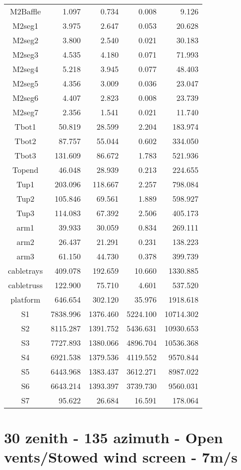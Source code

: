 \begin{longtable}{crrrr}
 M2Baffle & 1.097 & 0.734 & 0.008 & 9.126 \\
 M2seg1 & 3.975 & 2.647 & 0.053 & 20.628 \\
 M2seg2 & 3.800 & 2.540 & 0.021 & 30.183 \\
 M2seg3 & 4.535 & 4.180 & 0.071 & 71.993 \\
 M2seg4 & 5.218 & 3.945 & 0.077 & 48.403 \\
 M2seg5 & 4.356 & 3.009 & 0.036 & 23.047 \\
 M2seg6 & 4.407 & 2.823 & 0.008 & 23.739 \\
 M2seg7 & 2.356 & 1.541 & 0.021 & 11.740 \\
 Tbot1 & 50.819 & 28.599 & 2.204 & 183.974 \\
 Tbot2 & 87.757 & 55.044 & 0.602 & 334.050 \\
 Tbot3 & 131.609 & 86.672 & 1.783 & 521.936 \\
 Topend & 46.048 & 28.939 & 0.213 & 224.655 \\
 Tup1 & 203.096 & 118.667 & 2.257 & 798.084 \\
 Tup2 & 105.846 & 69.561 & 1.889 & 598.927 \\
 Tup3 & 114.083 & 67.392 & 2.506 & 405.173 \\
 arm1 & 39.933 & 30.059 & 0.834 & 269.111 \\
 arm2 & 26.437 & 21.291 & 0.231 & 138.223 \\
 arm3 & 61.150 & 44.730 & 0.378 & 399.739 \\
 cabletrays & 409.078 & 192.659 & 10.660 & 1330.885 \\
 cabletruss & 122.900 & 75.710 & 4.601 & 537.520 \\
 platform & 646.654 & 302.120 & 35.976 & 1918.618 \\
 S1 & 7838.996 & 1376.460 & 5224.100 & 10714.302 \\
 S2 & 8115.287 & 1391.752 & 5436.631 & 10930.653 \\
 S3 & 7727.893 & 1380.066 & 4896.704 & 10536.368 \\
 S4 & 6921.538 & 1379.536 & 4119.552 & 9570.844 \\
 S5 & 6443.968 & 1383.437 & 3612.271 & 8987.022 \\
 S6 & 6643.214 & 1393.397 & 3739.730 & 9560.031 \\
 S7 & 95.622 & 26.684 & 16.591 & 178.064 \\
\bottomrule
\end{longtable}




\section{30 zenith - 135 azimuth - Open vents/Stowed wind screen - 7m/s}
\label{zen30az135_OS7}

